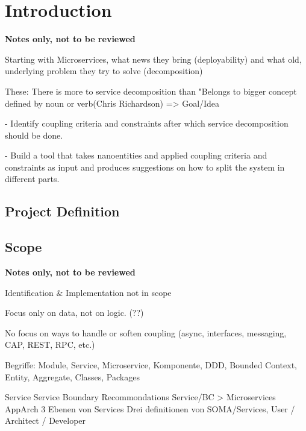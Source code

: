 \chapter{Introduction}

\textbf{Notes only, not to be reviewed}

Starting with Microservices, what news they bring (deployability) and what old, underlying problem they try to solve (decomposition)

These: There is more to service decomposition than "Belongs to bigger concept defined by noun or verb(Chris Richardson)
=> Goal/Idea

- Identify coupling criteria and constraints after which service 
decomposition should be done. 

- Build a tool that takes nanoentities and applied coupling criteria and constraints as input and produces suggestions on how to split the system in different parts. 

\section{Project Definition}


\section{Scope}

\textbf{Notes only, not to be reviewed}

Identification \& Implementation not in scope

Focus only on data, not on logic. (??)

No focus on ways to handle or soften coupling (async, interfaces, messaging, CAP, REST, RPC, etc.)

Begriffe: Module, Service, Microservice, Komponente, DDD, Bounded Context, Entity, Aggregate, Classes, Packages

Service
Service Boundary Recommondations
Service/BC > Microservices 
AppArch 3 Ebenen von Services
Drei definitionen von SOMA/Services, User / Architect / Developer